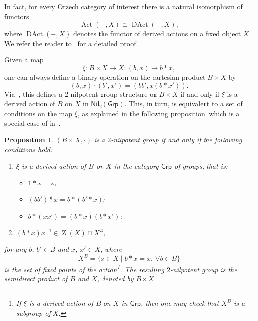 \documentclass[reqno,hidelinks,a4paper]{amsart}
\theoremstyle{plain}
\newtheorem{proposition}[subsection]{Proposition}
\theoremstyle{definition}
\theoremstyle{remark}
\numberwithin{equation}{section}
\DeclareMathOperator{\bZ}{Z}
\DeclareMathOperator{\Act}{Act}
\DeclareMathOperator{\DAct}{DAct}
\newcommand{\Grp}{\ensuremath{\mathsf{Grp}}}
\newcommand{\Nil}{\ensuremath{\mathsf{Nil}}}
\begin{document}
In fact, for every Orzech category of interest there is a natural isomorphism of functors
\[
    \Act(-,X) \cong \DAct(-,X),
\]
where \(\DAct(-,X)\) denotes the functor of derived actions on a fixed object \(X\). We refer the reader to~\cite[Remark 3.16 and Proposition 3.17]{Mancini_Thesis} for a detailed proof.

Given a map
\[
    \xi \colon B \times X \to X \colon (b,x) \mapsto b \ast x,
\]
one can always define a binary operation on the cartesian product \(B \times X\) by
\[
    (b,x) \cdot (b',x')=(bb',x (b \ast x')).
\]
Via~\cite[Theorem 2.4]{Orzech}, this defines a \(2\)-nilpotent group structure on \(B \times X\) if and only if \(\xi\) is a derived action of \(B\) on \(X\) in \(\Nil_2(\Grp)\). This, in turn, is equivalent to a set of conditions on the map \(\xi\), as explained in the following proposition, which is a special case of in~\cite[Proposition 1.1]{Datuashvili}.

\begin{proposition}\label{PropAct}
    \((B \times X,\cdot)\) is a \(2\)-nilpotent group if and only if the following conditions hold:
    \begin{enumerate}
        \item \(\xi\) is a derived action of \(B\) on \(X\) in the category \(\Grp\) of groups, that is:
              \begin{itemize}
                  \item[(i)] \(1 \ast x = x\);
                  \item[(ii)] \((bb') \ast x = b \ast (b' \ast x)\);
                  \item[(iii)] \(b \ast (xx') = (b \ast x)(b \ast x')\);
              \end{itemize}

        \item \((b \ast x)x^{-1} \in \bZ(X)\cap X^B\),
    \end{enumerate}
    for any \(b\), \(b' \in B\) and \(x\), \(x' \in X\), where
    \[
        X^B=\{x \in X \mid b\ast x=x, \; \forall b\in B\}
    \]
    is the set of fixed points of the action\footnote{If \(\xi\) is a derived action of \(B\) on \(X\) in \(\Grp\), then one may check that \(X^B\) is a subgroup of \(X\).}. The resulting \(2\)-nilpotent group is the \emph{semidirect product} of \(B\) and \(X\), denoted by \(B \ltimes X\).
\end{proposition}
\end{document}
